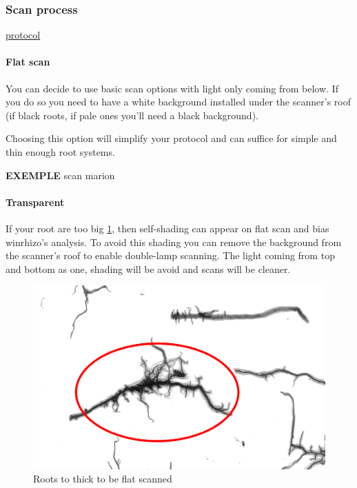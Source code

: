 \documentclass[
  12pt,
  american,
  a4paper,
  extrafontsizes,onecolumn,openright
  ]{memoir}
\begin{document}
\hypertarget{scan-process}{%
\subsubsection{Scan process}\label{scan-process}}

\href{document/trait/rootmorpho/Parametre_Scanner.pdf}{protocol}

\hypertarget{flat-scan}{%
\paragraph{Flat scan}\label{flat-scan}}

You can decide to use basic scan options with light only coming from below. If you do so you need to have a white background installed under the scanner's roof (if black roots, if pale ones you'll need a black background).

Choosing this option will simplify your protocol and can suffice for simple and thin enough root systems.

\textbf{EXEMPLE} scan marion

\hypertarget{transparent}{%
\paragraph{Transparent}\label{transparent}}

If your root are too big \ref{fig:bigroots}, then self-shading can appear on flat scan and bias winrhizo's analysis. To avoid this shading you can remove the background from the scanner's roof to enable double-lamp scanning. The light coming from top and bottom as one, shading will be avoid and scans will be cleaner.

\scriptsize

\begin{figure}

{\centering \includegraphics[width=0.5\linewidth]{document/trait/rootmorpho/thickroot} 

}

\caption{Roots to thick to be flat scanned}\label{fig:bigroots}
\end{figure}
\end{document}
